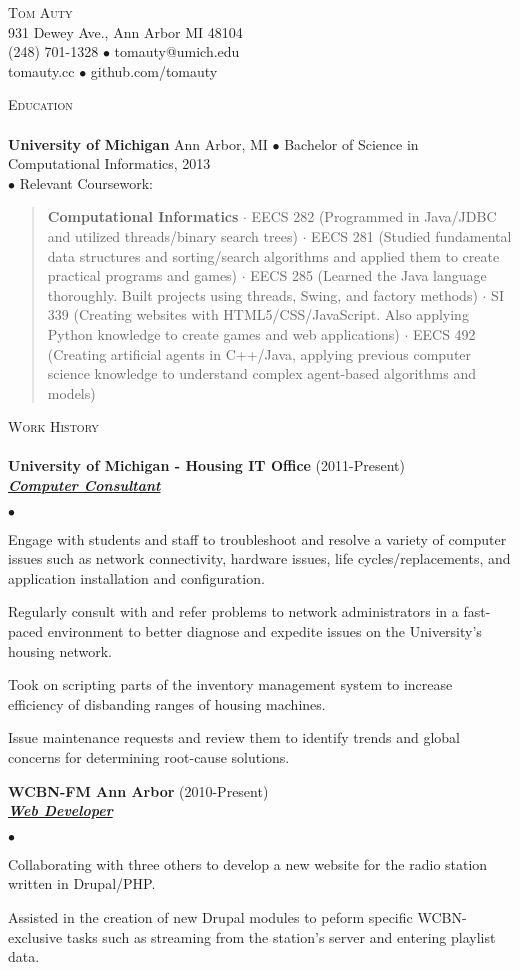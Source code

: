 \documentclass{article}
\newcommand{\area}[2]{\vspace*{-9pt} \begin{verse}\textbf{#1}   #2 \end{verse}  }
\newcommand{\lineunder}{\vspace*{-8pt} \\ \hspace*{-18pt} \hrulefill \\}
\newcommand{\header}[1]{{\hspace*{-15pt}\vspace*{6pt} \textsc{#1}} \vspace*{-6pt} \lineunder}
\newcommand{\employer}[3]{{ \textbf{#1} (#2)\\ \underline{\textbf{\emph{#3}}}\\  }}
\newcommand{\contact}[4]{
\vspace*{-4pt}
\begin{center}
{\LARGE \scshape {#1}}\\
#2 \\
#3 \\
#4
\end{center}
\vspace*{-8pt}
}
\newenvironment{achievements}{\begin{list}{$\bullet$}{\topsep 0pt \itemsep -2pt}}{\vspace*{4pt}\end{list}}
\newcommand{\schoolwithcourses}[4]{
 \textbf{#1} #2 $\bullet$ #3\\ 
#4 $\bullet$  Relevant Coursework:\\
\vspace*{8pt}
}
\begin{document}
\small
\smallskip
\vspace*{-44pt}

\contact{Tom Auty}
{931 Dewey Ave., Ann Arbor MI 48104}
{(248) 701-1328 $\bullet$ tomauty@umich.edu}
{tomauty.cc $\bullet$ github.com/tomauty}

\header{Education}

\schoolwithcourses{University of Michigan}{Ann Arbor, MI}{Bachelor of Science in Computational Informatics, 2013}
{}
	\area{Computational Informatics}{ $\cdot$ EECS 282 (Programmed in Java/JDBC and utilized threads/binary search trees) $\cdot$ EECS 281 (Studied fundamental data structures and sorting/search algorithms and applied them to create practical programs and games) $\cdot$ EECS 285 (Learned the Java language thoroughly. Built projects using threads, Swing, and factory methods) $\cdot$ SI 339 (Creating websites with HTML5/CSS/JavaScript. Also applying Python knowledge to create games and web applications) $\cdot$ EECS 492 (Creating artificial agents in C++/Java, applying previous computer science knowledge to understand complex agent-based algorithms and models)}

\header{Work History}
\employer{University of Michigan - Housing IT Office}{2011-Present}{Computer Consultant}
	\begin{achievements}
	\item Engage with students and staff to troubleshoot and resolve a variety of computer issues such as network connectivity, hardware issues, life cycles/replacements, and application installation and configuration.
	\item Regularly consult with and refer problems to network administrators in a fast-paced environment to better diagnose and expedite issues on the University's housing network.
	\item Took on scripting parts of the inventory management system to increase efficiency of disbanding ranges of housing machines.
	\item Issue maintenance requests and review them to identify trends and global concerns for determining root-cause solutions.
	\end{achievements}

\employer{WCBN-FM Ann Arbor}{2010-Present}{Web Developer}
	\begin{achievements}
	\item Collaborating with three others to develop a new website for the radio station written in Drupal/PHP. 
	\item Assisted in the creation of new Drupal modules to peform specific WCBN-exclusive tasks such as streaming from the station's server and entering playlist data.
	\end{achievements}
\end{document}
